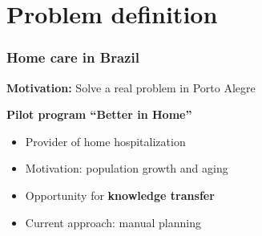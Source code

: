 \section{Problem definition}

\begin{frame}[plain]
   \sectionpage
\end{frame}

\begin{frame}
   \frametitle{Home care in Brazil}

   \textbf{Motivation: } Solve a real problem in Porto Alegre

   \vspace{12pt}

   \textbf{Pilot program ``Better in Home''}
   \begin{itemize}
      \item Provider of home hospitalization
      \item Motivation: population growth and aging
      \item Opportunity for \textbf{knowledge transfer}
      \item Current approach: manual planning
   \end{itemize}

\end{frame}

